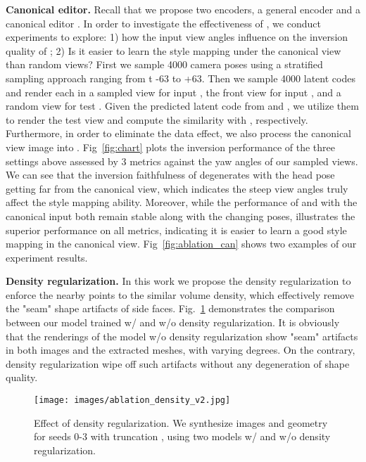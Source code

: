 \documentclass[acmtog]{acmart}
\begin{document}
\noindent \textbf{Canonical editor.} Recall that we propose two encoders, a general encoder  and a canonical editor . In order to investigate the effectiveness of , we conduct experiments to explore: 1) how the input view angles influence on the inversion quality of ; 2) Is it easier to learn the style mapping under the canonical view than random views? First we sample 4000 camera poses using a stratified
sampling approach ranging from t -63 to +63. Then we sample 4000 latent codes and render each in a sampled view for  input , the front view for  input , and a random view for test . Given the predicted latent code from  and , we utilize them to render the test view and compute the similarity with , respectively. Furthermore, in order to eliminate the data effect, we also process the canonical view image  into . Fig~\ref{fig:chart} plots the inversion performance of the three settings above assessed by 3 metrics against the yaw angles of our sampled views. We can see that the inversion faithfulness of  degenerates with the head pose getting far from the canonical view, which indicates the steep view angles truly affect the style mapping ability. Moreover, while the performance of  and  with the canonical input both remain stable along with the changing poses,  illustrates the superior performance on all metrics, indicating it is easier to learn a good style mapping in the canonical view. Fig~\ref{fig:ablation_can} shows two examples of our experiment results. 

\noindent \textbf{Density regularization.} In this work we propose the density regularization to enforce the nearby points to the similar volume density, which effectively remove the "seam" shape artifacts of side faces. Fig.~\ref{fig:density} demonstrates the comparison between our model trained w/ and w/o density regularization. It is obviously that the renderings of the model w/o density regularization show "seam" artifacts in both images and the extracted meshes, with varying degrees. On the contrary, density regularization wipe off such artifacts without any degeneration of shape quality. 

\begin{figure}[t]
  \centering
  \texttt{[image: images/ablation\_density\_v2.jpg]}
  \caption{Effect of density regularization. We synthesize images and geometry for seeds 0-3 with truncation , using two models w/ and w/o density regularization.}
  \Description{}
  \label{fig:density}
\end{figure}
\end{document}
